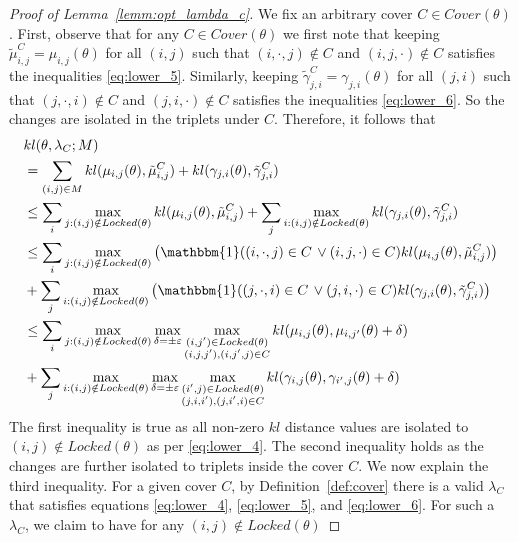 \documentclass{article}
\begin{document}
\begin{proof}[Proof of Lemma~\ref{lemm:opt_lambda_c}]
We fix an arbitrary cover $C \in Cover(\theta)$. First, observe that for any $C \in Cover(\theta)$ we first note that keeping  $\tilde{\mu}^C_{i,j} = \mu_{i,j}(\theta)$ for all $(i,j)$ such that $(i, \cdot, j) \notin C$  and $(i, j, \cdot) \notin C$ satisfies the inequalities \eqref{eq:lower_5}. Similarly,  keeping $\tilde{\gamma}^C_{j,i} = \gamma_{j,i}(\theta)$ for all $(j,i)$ such that $(j, \cdot, i) \notin C$  and $(j, i, \cdot) \notin C$ satisfies the inequalities \eqref{eq:lower_6}. So the changes are isolated in the triplets under $C$. Therefore, it follows that 
\begin{align*}
&kl(\theta, \lambda_C; M) \\
&= \sum_{(i,j)\in M}kl(\mu_{i,j}(\theta), \tilde{\mu}^C_{i,j}) + kl(\gamma_{j,i}(\theta), \tilde{\gamma}^C_{j,i})\\
%
&\leq \sum_{i}\max_{j:(i,j)\notin Locked(\theta)} kl(\mu_{i,j}(\theta), \tilde{\mu}^C_{i,j}) + \sum_{j}\max_{i:(i,j)\notin Locked(\theta)} kl(\gamma_{j,i}(\theta), \tilde{\gamma}^C_{j,i})\\
%
&\leq \sum_{i}\max_{j:(i,j)\notin Locked(\theta)}\left(\mathbbm{1}((i,\cdot,j)\in C\, \vee (i,j, \cdot) \in C) kl(\mu_{i,j}(\theta), \tilde{\mu}^C_{i,j}) \right) \\
&+  \sum_{j}\max_{i:(i,j)\notin Locked(\theta)} \left(\mathbbm{1}((j,\cdot,i)\in C\, \vee (j, i, \cdot) \in C) kl(\gamma_{j,i}(\theta), \tilde{\gamma}^C_{j,i})\right)\\
%
&\leq \sum_{i}\max_{j:(i,j)\notin Locked(\theta)}\max_{\delta = \pm\varepsilon}\max_{\substack{(i,j')\in Locked(\theta)\\ (i,j,j'), (i, j', j)\in C}} kl(\mu_{i,j}(\theta), \mu_{i,j'}(\theta) + \delta) \\
&+ \sum_{j}\max_{i:(i,j)\notin Locked(\theta)} 
\max_{\delta = \pm\varepsilon}\max_{\substack{(i',j)\in Locked(\theta)\\ (j,i,i'), (j, i', i)\in C}} kl(\gamma_{i,j}(\theta), \gamma_{i',j}(\theta) + \delta)
\end{align*}
The first inequality is true as all non-zero $kl$ distance values are isolated to $(i,j) \notin Locked(\theta)$ as per \eqref{eq:lower_4}. The second inequality holds as the changes are further isolated to triplets inside the cover $C$. We now explain the third inequality. 
For a given cover $C$, by Definition~\ref{def:cover}  there is a valid $\lambda_C$ that satisfies equations \eqref{eq:lower_4}, \eqref{eq:lower_5}, and \eqref{eq:lower_6}. For such a $\lambda_C$, we  claim to have for any $(i,j) \notin Locked(\theta)$

\end{proof}
\end{document}
